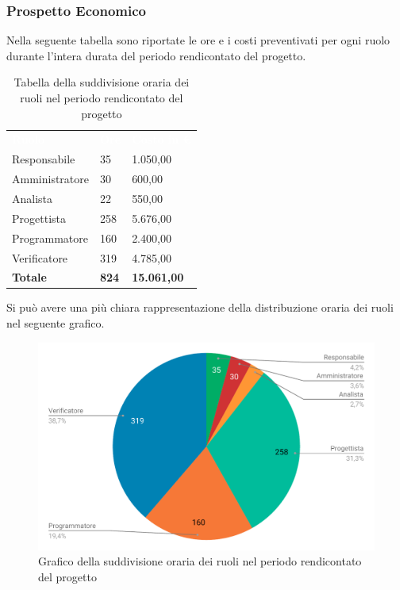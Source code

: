 \subsubsection{Prospetto Economico}
Nella seguente tabella sono riportate le ore e i costi preventivati per ogni ruolo durante l'intera durata del periodo rendicontato del progetto.


\begin{table}[H]	
	\begin{center}
	    \begin{tabular}{C{4cm}C{1cm}C{3,5cm}}
			\textcolor{white}{\textbf{Ruolo}} & \textcolor{white}{\textbf{Ore}} & \textcolor{white}{\textbf{Costo in €}}
			\\
			Responsabile & 35 & 1.050,00 \\
			Amministratore & 30 & 600,00 \\
			Analista & 22 & 550,00 \\
			Progettista & 258 & 5.676,00 \\
			Programmatore & 160 & 2.400,00 \\
			Verificatore & 319 & 4.785,00 \\
			\textbf{Totale} & \textbf{824} & \textbf{15.061,00} \\
		\end{tabular}
	    \caption{Tabella della suddivisione oraria dei ruoli nel periodo rendicontato del progetto} \label{tab:tabellaRuoliTotale} 
	\end{center}
\end{table}


Si può avere una più chiara rappresentazione della distribuzione oraria dei ruoli nel seguente grafico.

\begin{figure}[H]
	\includegraphics[width=1\linewidth]{Preventivo/grafici/TR2.pdf}
	\caption{Grafico della suddivisione oraria dei ruoli nel periodo rendicontato del progetto}
\end{figure}

